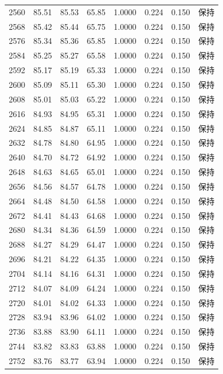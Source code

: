 \begin{longtable}{rrrrrrrr}
2560 & 85.51 & 85.53 & 65.85 & 1.0000 & 0.224 & 0.150 & 保持 \\
2568 & 85.42 & 85.44 & 65.75 & 1.0000 & 0.224 & 0.150 & 保持 \\
2576 & 85.34 & 85.36 & 65.85 & 1.0000 & 0.224 & 0.150 & 保持 \\
2584 & 85.25 & 85.27 & 65.58 & 1.0000 & 0.224 & 0.150 & 保持 \\
2592 & 85.17 & 85.19 & 65.33 & 1.0000 & 0.224 & 0.150 & 保持 \\
2600 & 85.09 & 85.11 & 65.30 & 1.0000 & 0.224 & 0.150 & 保持 \\
2608 & 85.01 & 85.03 & 65.22 & 1.0000 & 0.224 & 0.150 & 保持 \\
2616 & 84.93 & 84.95 & 65.31 & 1.0000 & 0.224 & 0.150 & 保持 \\
2624 & 84.85 & 84.87 & 65.11 & 1.0000 & 0.224 & 0.150 & 保持 \\
2632 & 84.78 & 84.80 & 64.95 & 1.0000 & 0.224 & 0.150 & 保持 \\
2640 & 84.70 & 84.72 & 64.92 & 1.0000 & 0.224 & 0.150 & 保持 \\
2648 & 84.63 & 84.65 & 65.01 & 1.0000 & 0.224 & 0.150 & 保持 \\
2656 & 84.56 & 84.57 & 64.78 & 1.0000 & 0.224 & 0.150 & 保持 \\
2664 & 84.48 & 84.50 & 64.58 & 1.0000 & 0.224 & 0.150 & 保持 \\
2672 & 84.41 & 84.43 & 64.68 & 1.0000 & 0.224 & 0.150 & 保持 \\
2680 & 84.34 & 84.36 & 64.59 & 1.0000 & 0.224 & 0.150 & 保持 \\
2688 & 84.27 & 84.29 & 64.47 & 1.0000 & 0.224 & 0.150 & 保持 \\
2696 & 84.21 & 84.22 & 64.35 & 1.0000 & 0.224 & 0.150 & 保持 \\
2704 & 84.14 & 84.16 & 64.31 & 1.0000 & 0.224 & 0.150 & 保持 \\
2712 & 84.07 & 84.09 & 64.24 & 1.0000 & 0.224 & 0.150 & 保持 \\
2720 & 84.01 & 84.02 & 64.33 & 1.0000 & 0.224 & 0.150 & 保持 \\
2728 & 83.94 & 83.96 & 64.02 & 1.0000 & 0.224 & 0.150 & 保持 \\
2736 & 83.88 & 83.90 & 64.11 & 1.0000 & 0.224 & 0.150 & 保持 \\
2744 & 83.82 & 83.83 & 63.88 & 1.0000 & 0.224 & 0.150 & 保持 \\
2752 & 83.76 & 83.77 & 63.94 & 1.0000 & 0.224 & 0.150 & 保持 \\

\end{longtable}
